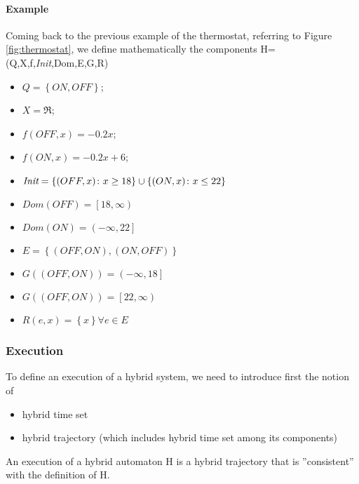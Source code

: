 \paragraph{Example}
Coming back to the previous example of the thermostat, referring to Figure \ref{fig:thermostat}, we define mathematically the components H=(Q,X,f,\textit{Init},Dom,E,G,R)
\begin{itemize}
	\item $Q=\left\{ON,OFF\right\}$;
	\item $X=\Re$;
	\item $f(OFF,x)=-0.2x$; 
	\item $f(ON,x)=-0.2x+6$;
	\item $\emph{Init}=\left\{(OFF,x)\colon x\ge18\right\} \cup \left\{(ON,x)\colon x\le22\right\}$ 
	\item $Dom(OFF)=\left[18,\infty \right)$
	\item $Dom(ON)=\left(-\infty,22\right]$
	\item $E=\left\{(OFF,ON),(ON,OFF)\right\}$
	\item$G((OFF,ON))=\left(-\infty,18\right]$
	\item$G((OFF,ON))=\left[22,\infty\right)$
	\item$R(e,x)=\left\{x \right\} \forall e \in E$
\end{itemize}
\subsubsection{Execution}
To define an execution of a hybrid system, we need to introduce first the notion of
\begin{itemize}
	\item hybrid time set
	\item hybrid trajectory (which includes hybrid time set among its components)
\end{itemize}

An execution of a hybrid automaton H is a hybrid trajectory that is ''consistent'' with the definition of H.

